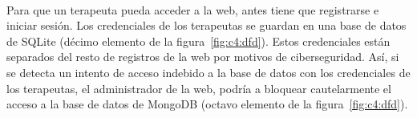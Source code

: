 \paragraph{}
Para que un terapeuta pueda acceder a la web, antes tiene que registrarse e iniciar sesión. Los credenciales de los terapeutas se guardan en una base de datos de SQLite (décimo elemento de la figura~\ref{fig:c4:dfd}). Estos credenciales están separados del resto de registros de la web por motivos de ciberseguridad. Así, si se detecta un intento de acceso indebido a la base de datos con los credenciales de los terapeutas, el administrador de la web, podría a bloquear cautelarmente el acceso a la base de datos de MongoDB (octavo elemento de la figura~\ref{fig:c4:dfd}).